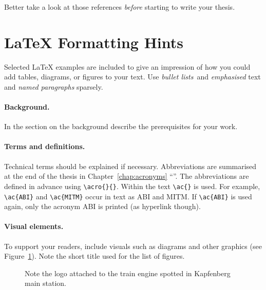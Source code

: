 Better take a look at those references \emph{before} starting to write 
your thesis.


\section{\LaTeX{} Formatting Hints}

Selected \LaTeX{} examples are included to give an impression of how you could add tables, diagrams, or figures to your text. Use \emph{bullet lists} and \emph{emphasised} text and \emph{named paragraphs} sparsely. 

\paragraph{Background.} In the section on the background describe
the prerequisites for your work.

\paragraph{Terms and definitions.}
Technical terms should be explained if necessary. Abbreviations are
summarised at the end of the thesis in Chapter~\ref{chap:acronyms}
``''. The abbreviations are defined in advance 
using \verb+\acro{}{}+. Within the text \verb+\ac{}+ is used. For 
example, \verb+\ac{ABI}+ and \verb+\ac{MITM}+ occur in text 
as \ac{ABI} and \ac{MITM}. If \verb+\ac{ABI}+ is used again, only 
the acronym \ac{ABI} is printed (as hyperlink though).

\paragraph{Visual elements.} 
To support your readers, include visuals such as diagrams and other graphics
(see Figure~\ref{fig:engine}). Note the short title used for the list of
figures.




\begin{figure}[tp]
  \centering
  \caption[Logo at the Train Engine]
          {Note the logo attached to the train
           engine spotted in Kapfenberg main station.}
  \label{fig:engine}
\end{figure}

